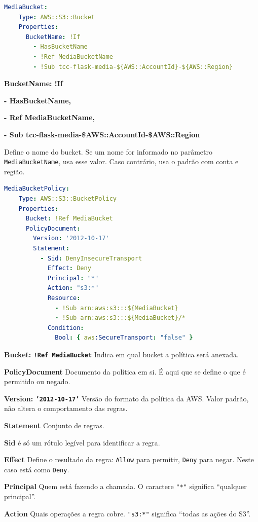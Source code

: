 \begin{lstlisting}[language=YAML]
MediaBucket:
    Type: AWS::S3::Bucket
    Properties:
      BucketName: !If
        - HasBucketName
        - !Ref MediaBucketName
        - !Sub tcc-flask-media-${AWS::AccountId}-${AWS::Region}
\end{lstlisting}

\textbf{BucketName: !If}

\textbf{ - HasBucketName,} 

\textbf{ - \!Ref MediaBucketName,}

\textbf{ - \!Sub tcc-flask-media-\${AWS::AccountId}-\${AWS::Region}}

Define o nome do bucket. Se um nome for informado no parâmetro \texttt{MediaBucketName}, usa esse valor. Caso contrário, usa o padrão com conta e região.

\begin{lstlisting}[language=YAML]
MediaBucketPolicy:
    Type: AWS::S3::BucketPolicy
    Properties:
      Bucket: !Ref MediaBucket
      PolicyDocument:
        Version: '2012-10-17'
        Statement:
          - Sid: DenyInsecureTransport
            Effect: Deny
            Principal: "*"
            Action: "s3:*"
            Resource:
              - !Sub arn:aws:s3:::${MediaBucket}
              - !Sub arn:aws:s3:::${MediaBucket}/*
            Condition:
              Bool: { aws:SecureTransport: "false" }
\end{lstlisting}


\textbf{Bucket: \texttt{!Ref MediaBucket}} Indica em qual bucket a política será anexada.

\textbf{PolicyDocument} Documento da política em si. É aqui que se define o que é permitido ou negado.

\textbf{Version: \texttt{'2012-10-17'}} Versão do formato da política da AWS. Valor padrão, não altera o comportamento das regras.

\textbf{Statement} Conjunto de regras. 

\textbf{Sid} é só um rótulo legível para identificar a regra.

\textbf{Effect} Define o resultado da regra: \texttt{Allow} para permitir, \texttt{Deny} para negar. Neste caso está como \texttt{Deny}.

\textbf{Principal} Quem está fazendo a chamada. O caractere \texttt{"*"} significa “qualquer principal”.

\textbf{Action} Quais operações a regra cobre. \texttt{"s3:*"} significa “todas as ações do S3”.

